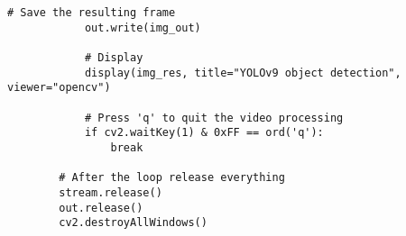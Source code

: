 \begin{lstlisting}[caption={detect.py}]
            # Save the resulting frame
            out.write(img_out)
        
            # Display
            display(img_res, title="YOLOv9 object detection", viewer="opencv")
        
            # Press 'q' to quit the video processing
            if cv2.waitKey(1) & 0xFF == ord('q'):
                break
        
        # After the loop release everything
        stream.release()
        out.release()
        cv2.destroyAllWindows()
    \end{lstlisting}




